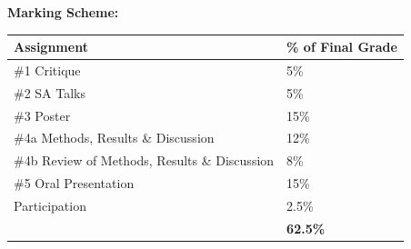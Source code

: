 \documentclass[hidelinks]{article}
\begin{document}
	\textbf{Marking Scheme:}
		\begin{table}[H]
		\centering
			\begin{tabular}{l l}
				\toprule
				\textbf{Assignment} & \textbf{\% of Final Grade}\\
				\midrule
				\#1 Critique & 5\%\\
				\addlinespace
				\#2 SA Talks & 5\%\\
				\addlinespace
				\#3 Poster & 15\%\\
				\addlinespace
				\#4a Methods, Results \& Discussion & 12\%\\
				\addlinespace
				\#4b Review of Methods, Results \& Discussion & 8\%\\
				\addlinespace
				\#5 Oral Presentation & 15\%\\
				\addlinespace
				Participation & 2.5\%\\
				\midrule
				& \textbf{62.5\%}\\
				\bottomrule
			\end{tabular}
		\end{table}	
\end{document}
